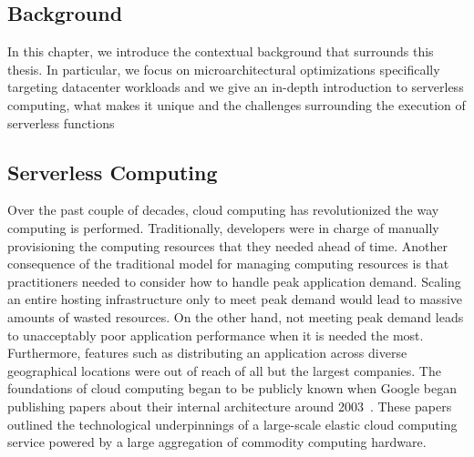 \documentclass[../main.tex]{subfiles}
\begin{document}
\ifx\chapincluded\undefined
  \begin{refsection}
 \fi

\chapter{Background}
\label{chap:background}
In this chapter, we introduce the contextual background that surrounds
this thesis. In particular, we focus on microarchitectural
optimizations specifically targeting datacenter workloads and we give
an in-depth introduction to serverless computing, what makes it unique
and the challenges surrounding the execution of serverless functions



\section{Serverless Computing}
\label{sec:serverless}


Over the past couple of decades, cloud computing has revolutionized
the way computing is performed. Traditionally, developers were in
charge of manually provisioning the computing resources that they
needed ahead of time. Another consequence of the traditional model for
managing computing resources is that practitioners needed to consider
how to handle peak application demand. Scaling an entire hosting
infrastructure only to meet peak demand would lead to massive amounts
of wasted resources. On the other hand, not meeting peak demand leads
to unacceptably poor application performance when it is needed the
most. Furthermore, features such as distributing an application across
diverse geographical locations were out of reach of all but the
largest companies. The foundations of cloud computing began to be
publicly known when Google began publishing papers about their
internal architecture around
2003~\cite{qian2009cloud,gfs,dean2008mapreduce,barroso03_web_searc_planet}. These
papers outlined the technological underpinnings of a large-scale
elastic cloud computing service powered by a large aggregation of
commodity computing hardware.


\end{refsection}
\end{document}
